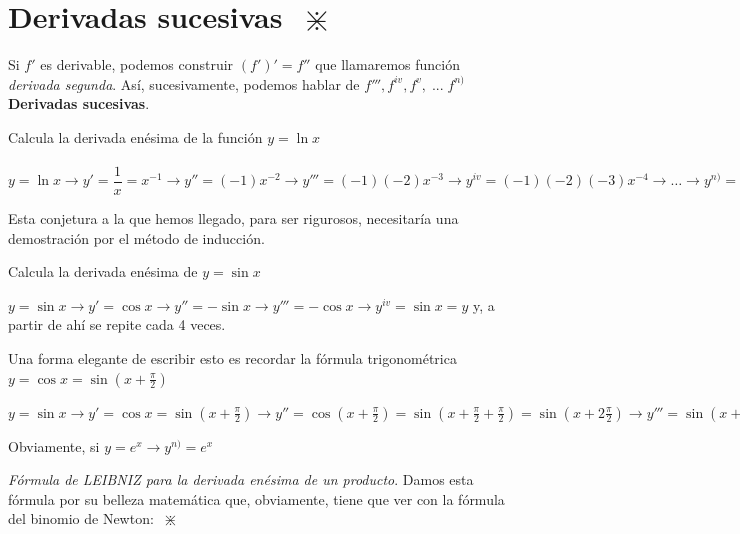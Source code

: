 \section{Derivadas sucesivas   $\; \divideontimes$    }
\label{derivadas-sucesivas}
	
	Si $f'$ es derivable, podemos construir $(f')'=f''$ que llamaremos función \textit{derivada segunda}. Así, sucesivamente, podemos hablar de $f''', f^{iv}, f^{v},\;  ... \; f^{n)}$ \textbf{Derivadas sucesivas}.
	
	\begin{ejem} Calcula la derivada enésima de la función $y=\ln x$
	
	$y=\ln x \to y'=\dfrac 1 x = x^{-1} \to y''=(-1)x^{-2} \to y'''=(-1)(-2)x^{-3} \to  y^{iv}=(-1)(-2)(-3)x^{-4} \to \dots \to y^{n)}=(-1)^{n-1}(n-1)!\; x^{-n}=\dfrac{(-1)^{n-1}(n-1)!}{x^n}$
	
	Esta conjetura a la que hemos llegado, para ser rigurosos, necesitaría una demostración por el método de inducción.
		
	\end{ejem}
	
	\begin{ejem} Calcula la derivada enésima de $y=\sin x$
	
	$y=\sin x \to y'=\cos x \to y''=-\sin x \to y'''=-\cos x \to y^{iv}=\sin x =y$ y, a partir de ahí se repite cada 4 veces. 
	

	
	Una forma elegante de escribir esto es recordar la fórmula trigonométrica $y=\cos x=\sin (x+\frac \pi 2)$
	
		$y=\sin x \to y'=\cos x=\sin (x+\frac \pi 2) \to y''=\cos (x+\frac \pi 2)=\sin (x+\frac \pi 2+ \frac \pi 2)=\sin (x+2\frac \pi 2) \to y'''=\sin (x+3\frac \pi 2) \to \dots \to y^{n)}=\sin (x+n\frac \pi 2)$
	
	\end{ejem}
	
	\begin{ejem} 
	Obviamente, si $y=e^x \to y^{n)}=e^x$ 
		
	\end{ejem}
	
	 \emph{Fórmula de LEIBNIZ para la derivada enésima de un producto}. Damos esta fórmula por su belleza matemática que, obviamente, tiene que ver con la fórmula del binomio de Newton: $\; \divideontimes$
	
